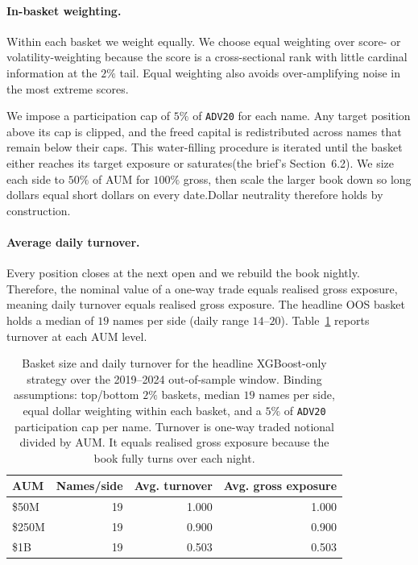 \documentclass[12pt]{article}
\begin{document}
\paragraph{In-basket weighting.}
Within each basket we weight equally. We choose equal
weighting over score- or volatility-weighting because the score is a cross-sectional rank with little cardinal information at the $2\%$ tail. Equal weighting also avoids over-amplifying noise in the most extreme scores. 

We impose a participation cap of $5\%$ of \texttt{ADV20} for each name. Any target position above its cap is clipped, and the freed capital is redistributed across names that remain below their caps. This water-filling procedure is iterated until the basket either reaches its target exposure or saturates(the brief's Section~6.2). We size each side to $50\%$ of AUM for $100\%$ gross, then scale the larger book down so long dollars equal short dollars on every date.Dollar neutrality therefore holds by construction.



\paragraph{Average daily turnover.}
Every position closes at the next open and we rebuild the book nightly. Therefore, the nominal value of a one-way trade equals realised gross exposure, meaning daily turnover equals realised gross exposure. The headline OOS basket holds a median of $19$ names per side (daily range $14$--$20$). Table~\ref{tab:step5-q1-turnover} reports turnover at each AUM level.

\begin{table}[H]
\centering
\small
\begin{tabular}{lrrr}
\toprule
AUM & Names/side & Avg. turnover & Avg. gross exposure \\
\midrule
\$50M  & 19 & 1.000 & 1.000 \\
\$250M & 19 & 0.900 & 0.900 \\
\$1B   & 19 & 0.503 & 0.503 \\
\bottomrule
\end{tabular}
\caption{Basket size and daily turnover for the headline XGBoost-only strategy
over the 2019--2024 out-of-sample window. Binding assumptions: top/bottom
$2\%$ baskets, median $19$ names per side, equal dollar weighting within each
basket, and a $5\%$ of \texttt{ADV20} participation cap per name. Turnover is
one-way traded notional divided by AUM. It equals realised gross exposure because
the book fully turns over each night.}
\label{tab:step5-q1-turnover}
\end{table}
\end{document}
